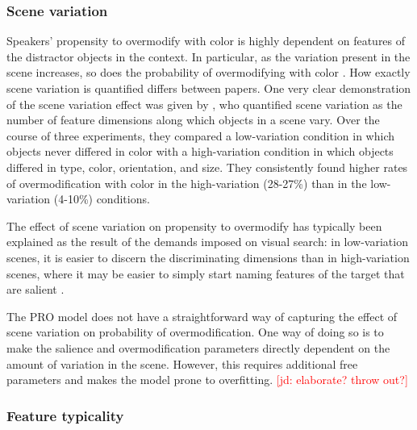 \documentclass[11pt]{article}
\newcommand{\jd}[1]{\textcolor{Red}{[jd: #1]}}
\begin{document}
\subsubsection{Scene variation}
\label{sec:scenevariation}

Speakers' propensity to overmodify with color is highly dependent on features of the distractor objects in the context. In particular, as the variation present in the scene increases, so does the probability of overmodifying with color \cite{Davies2013, Koolen2013}. How exactly scene variation is quantified differs between papers. One very clear demonstration of the scene variation effect was given by , who quantified scene variation as the number of feature dimensions along which objects in a scene vary. Over the course of three experiments, they compared a low-variation condition in which objects never differed in color with a high-variation condition in which objects differed in type, color, orientation, and size. They consistently found higher rates of overmodification with color in the high-variation (28-27\%) than in the low-variation (4-10\%) conditions.

The effect of scene variation on propensity to overmodify has typically been explained as the result of the demands imposed on visual search: in low-variation scenes, it is easier to discern the discriminating dimensions than in high-variation scenes, where it may be easier to simply start naming features of the target that are salient \cite{Koolen2013}. 

The PRO model does not have a straightforward way of capturing the effect of scene variation on probability of overmodification. One way of doing so is to make the salience and overmodification parameters directly dependent on the amount of variation in the scene. However, this requires additional free parameters and makes the model prone to overfitting. \jd{elaborate? throw out?}

\subsubsection{Feature typicality}
\label{sec:colortypicality}
\end{document}
